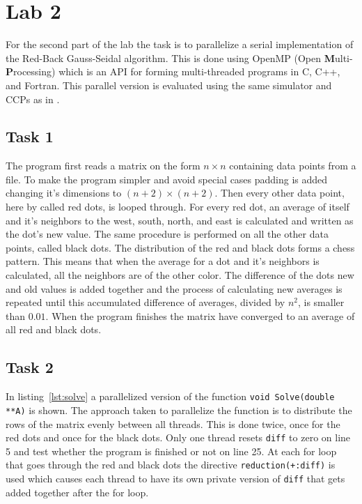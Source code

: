\section{Lab 2}
\label{sec:lab2}
For the second part of the lab the task is to parallelize a serial implementation of the Red-Back Gauss-Seidal algorithm. This is done using OpenMP (Open \textbf Multi-\textbf Processing) which is an API for forming multi-threaded programs in C, C++, and Fortran. This parallel version is evaluated using the same simulator and CCPs as in . 

\subsection{Task 1}
The program first reads a matrix on the form $n \times n$ containing data points from a file. To make the program simpler and avoid special cases padding is added changing it's dimensions to $(n+2) \times (n+2)$. Then every other data point, here by called red dots, is looped through. For every red dot, an average of itself and it's neighbors to the west, south, north, and east is calculated and written as the dot's new value. The same procedure is performed on all the other data points, called black dots. The distribution of the red and black dots forms a chess pattern. This means that when the average for a dot and it's neighbors is calculated, all the neighbors are of the other color. The difference of the dots new and old values is added together and the process of calculating new averages is repeated until this accumulated difference of averages, divided by $n^2$, is smaller than $0.01$. When the program finishes the matrix have converged to an average of all red and black dots.

\subsection{Task 2}
\label{subsec:lab2:task2}
In listing~\ref{lst:solve} a parallelized version of the function \texttt{void Solve(double **A)} is shown. The approach taken to parallelize the function is to distribute the rows of the matrix evenly between all threads. This is done twice, once for the red dots and once for the black dots. Only one thread resets \texttt{diff} to zero on line 5 and test whether the program is finished or not on line 25. At each for loop that goes through the red and black dots the directive \texttt{reduction(+:diff)} is used which causes each thread to have its own private version of \texttt{diff} that gets added together after the for loop.


